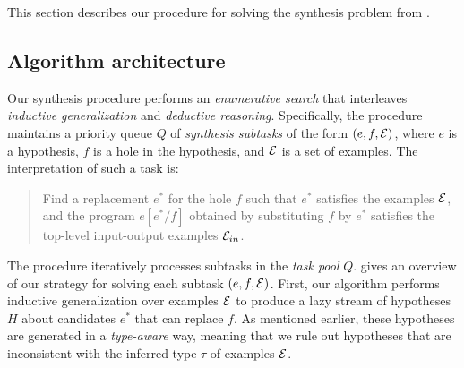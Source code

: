 This section describes our procedure for solving the synthesis problem
from .

\subsection{Algorithm architecture}\label{sec:overview}


Our synthesis procedure performs an \emph{enumerative search} that
interleaves \emph{inductive generalization} and \emph{deductive
  reasoning}. Specifically, the procedure maintains a priority queue
$Q$ of {\em synthesis subtasks} of the form $(e, f, \mathcal{E})$, where $e$ is
a hypothesis, $f$ is a hole in the hypothesis, and $\mathcal{E}$ is a set of
examples. The interpretation of such a task is:
\begin{quote}
  Find a replacement $e^*$ for the hole $f$ such that $e^*$ satisfies
  the examples $\mathcal{E}$, and the program $e[e^*/f]$ obtained by
  substituting $f$ by $e^*$ satisfies the top-level input-output
  examples $\mathcal{E}_{in}$.
\end{quote}

The procedure iteratively processes  subtasks in the \emph{task pool} $Q$.  
gives an overview of our strategy for solving each subtask $(e, f, \mathcal{E})$.
First, our algorithm performs inductive generalization over  examples $\mathcal{E}$ to
produce a lazy stream of hypotheses $H$ about candidates $e^*$ that can  replace $f$.
As mentioned earlier, these hypotheses are
generated in a {\em type-aware} way, meaning that we %
rule out hypotheses that
are inconsistent with the inferred type $\tau$ of examples $\mathcal{E}$.



